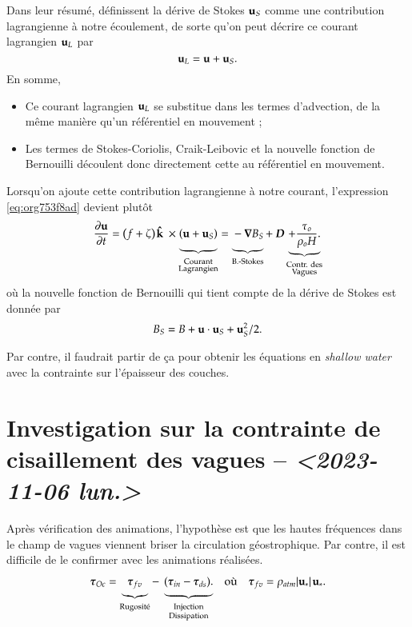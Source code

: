 \documentclass[10pt]{article}
\numberwithin{equation}{section}
\newcommand{\kvf}{\vb{\hat{k}}}
\newcommand{\uu}{\vb{u}}
\newcommand{\tall}{\vphantom{A^{x^x}_p}}
\newcommand{\grande}{\vphantom{\frac{1}{xx}}}
\newcommand{\pt}{\hspace{1pt}} %
\begin{document}
Dans leur résumé,   définissent la dérive de Stokes \(\uu_S\) comme une contribution lagrangienne à notre écoulement, de sorte qu'on peut décrire ce courant lagrangien \(\uu_L\) par
\begin{equation}
   \uu_L = \uu + \uu_S.
\end{equation}
En somme, 
\begin{itemize}
\item Ce courant lagrangien \(\uu_L\) se substitue dans les termes d'advection, de la même manière qu'un référentiel en mouvement ;
\item Les termes de Stokes-Coriolis, Craik-Leibovic et la nouvelle fonction de Bernouilli découlent donc directement cette au référentiel en mouvement. \bigskip
\end{itemize}

Lorsqu'on ajoute cette contribution lagrangienne à notre courant, l'expression \ref{eq:org753f8ad} devient plutôt
\begin{equation}
   \pdv{\uu}{t} = \qty(f+\zeta)\pt \kvf\ \times\underbrace{\grande\qty(\uu + \uu_S)}_{\substack{\text{Courant} \\ \text{Lagrangien}}} = \underbrace{\grande-\gradient{B_S}}_\text{B.-Stokes} + \ \boldsymbol{D} \underbrace{+ \frac{\tau_o}{\rho_o H}.}_{\substack{\text{Contr. des} \\ \text{Vagues}}}
\end{equation}
où la nouvelle fonction de Bernouilli qui tient compte de la dérive de Stokes est donnée par
\begin{align}
   B_S = B + \uu\cdot\uu_S + \uu_S^2/2.
\end{align}

Par contre, il faudrait partir de ça pour obtenir les équations en \emph{shallow water} avec la contrainte sur l'épaisseur des couches.

\section{Investigation sur la contrainte de cisaillement des vagues -- \textit{<2023-11-06 lun.>}}
\label{sec:org0da9da2}

Après vérification des animations, l'hypothèse est que les hautes fréquences dans le champ de vagues viennent briser la circulation géostrophique.
Par contre, il est difficile de le confirmer avec les animations réalisées.
\begin{align}
\label{eq:org84c4bb8}
   && \boldsymbol{\tau}_{Oc} = \underbrace{\tall\boldsymbol{\tau}_{fv}}_\text{Rugosité}  - \ \underbrace{(\tall\boldsymbol{\tau}_{in} - \boldsymbol{\tau}_{ds}).}_{\substack{\text{Injection} \\ \text{Dissipation}}}
   && \text{où}
   && \boldsymbol{\tau}_{fv} = \rho_{atm} \abs{\uu_*}\pt\uu_*. &&
\end{align}
\end{document}
